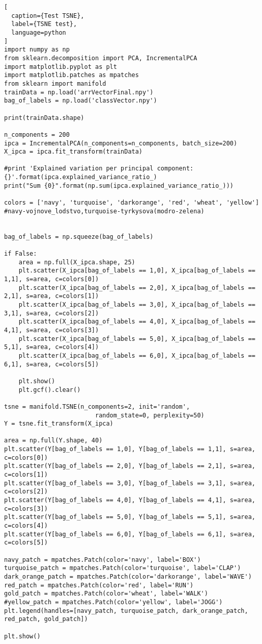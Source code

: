 \begin{lstlisting}[
  caption={Test TSNE},
  label={TSNE test},
  language=python
]
import numpy as np
from sklearn.decomposition import PCA, IncrementalPCA
import matplotlib.pyplot as plt
import matplotlib.patches as mpatches
from sklearn import manifold 
trainData = np.load('arrVectorFinal.npy')
bag_of_labels = np.load('classVector.npy')
 
print(trainData.shape)
 
n_components = 200
ipca = IncrementalPCA(n_components=n_components, batch_size=200)
X_ipca = ipca.fit_transform(trainData)
 
#print 'Explained variation per principal component: {}'.format(ipca.explained_variance_ratio_)
print("Sum {0}".format(np.sum(ipca.explained_variance_ratio_)))
 
colors = ['navy', 'turquoise', 'darkorange', 'red', 'wheat', 'yellow'] #navy-vojnove_lodstvo,turquoise-tyrkysova(modro-zelena)
 
 
bag_of_labels = np.squeeze(bag_of_labels)
 
if False:
    area = np.full(X_ipca.shape, 25)
    plt.scatter(X_ipca[bag_of_labels == 1,0], X_ipca[bag_of_labels == 1,1], s=area, c=colors[0])
    plt.scatter(X_ipca[bag_of_labels == 2,0], X_ipca[bag_of_labels == 2,1], s=area, c=colors[1])
    plt.scatter(X_ipca[bag_of_labels == 3,0], X_ipca[bag_of_labels == 3,1], s=area, c=colors[2])
    plt.scatter(X_ipca[bag_of_labels == 4,0], X_ipca[bag_of_labels == 4,1], s=area, c=colors[3])
    plt.scatter(X_ipca[bag_of_labels == 5,0], X_ipca[bag_of_labels == 5,1], s=area, c=colors[4])
    plt.scatter(X_ipca[bag_of_labels == 6,0], X_ipca[bag_of_labels == 6,1], s=area, c=colors[5])
 
    plt.show()
    plt.gcf().clear()
 
tsne = manifold.TSNE(n_components=2, init='random',
                         random_state=0, perplexity=50)
Y = tsne.fit_transform(X_ipca)
 
area = np.full(Y.shape, 40)
plt.scatter(Y[bag_of_labels == 1,0], Y[bag_of_labels == 1,1], s=area, c=colors[0])
plt.scatter(Y[bag_of_labels == 2,0], Y[bag_of_labels == 2,1], s=area, c=colors[1])
plt.scatter(Y[bag_of_labels == 3,0], Y[bag_of_labels == 3,1], s=area, c=colors[2])
plt.scatter(Y[bag_of_labels == 4,0], Y[bag_of_labels == 4,1], s=area, c=colors[3])
plt.scatter(Y[bag_of_labels == 5,0], Y[bag_of_labels == 5,1], s=area, c=colors[4])
plt.scatter(Y[bag_of_labels == 6,0], Y[bag_of_labels == 6,1], s=area, c=colors[5])
 
navy_patch = mpatches.Patch(color='navy', label='BOX')
turquoise_patch = mpatches.Patch(color='turquoise', label='CLAP')
dark_orange_patch = mpatches.Patch(color='darkorange', label='WAVE')
red_patch = mpatches.Patch(color='red', label='RUN')
gold_patch = mpatches.Patch(color='wheat', label='WALK')
#yellow_patch = mpatches.Patch(color='yellow', label='JOGG')
plt.legend(handles=[navy_patch, turquoise_patch, dark_orange_patch, red_patch, gold_patch])
 
plt.show()
\end{lstlisting}

